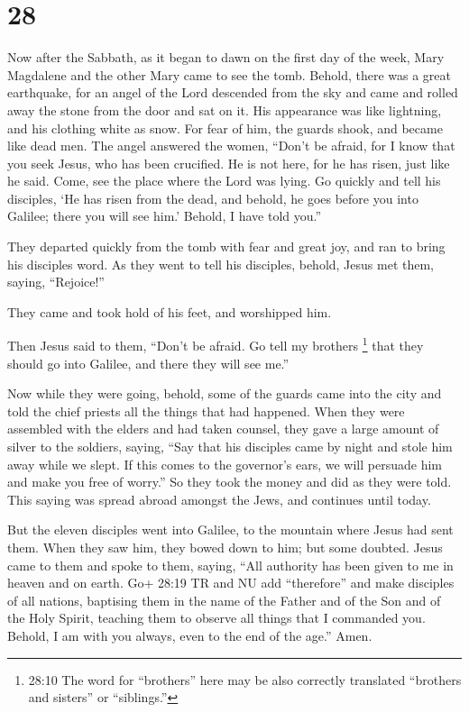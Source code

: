 \hypertarget{section-27}{%
\section{28}\label{section-27}}

 Now after the Sabbath, as it began to dawn on the first day
of the week, Mary Magdalene and the other Mary came to see the tomb.
 Behold, there was a great earthquake, for an angel of the
Lord descended from the sky and came and rolled away the stone from the
door and sat on it.  His appearance was like lightning, and
his clothing white as snow.  For fear of him, the guards
shook, and became like dead men.  The angel answered the
women, ``Don't be afraid, for I know that you seek Jesus, who has been
crucified.  He is not here, for he has risen, just like he
said. Come, see the place where the Lord was lying.  Go
quickly and tell his disciples, `He has risen from the dead, and behold,
he goes before you into Galilee; there you will see him.' Behold, I have
told you.''

 They departed quickly from the tomb with fear and great
joy, and ran to bring his disciples word.  As they went to
tell his disciples, behold, Jesus met them, saying, ``Rejoice!''

They came and took hold of his feet, and worshipped him.

 Then Jesus said to them, ``Don't be afraid. Go tell my
brothers \footnote{28:10 The word for ``brothers'' here may be also
  correctly translated ``brothers and sisters'' or ``siblings.''} that
they should go into Galilee, and there they will see me.''

 Now while they were going, behold, some of the guards came
into the city and told the chief priests all the things that had
happened.  When they were assembled with the elders and had
taken counsel, they gave a large amount of silver to the soldiers,
 saying, ``Say that his disciples came by night and stole
him away while we slept.  If this comes to the governor's
ears, we will persuade him and make you free of worry.'' 
So they took the money and did as they were told. This saying was spread
abroad amongst the Jews, and continues until today.

 But the eleven disciples went into Galilee, to the
mountain where Jesus had sent them.  When they saw him,
they bowed down to him; but some doubted.  Jesus came to
them and spoke to them, saying, ``All authority has been given to me in
heaven and on earth.  Go+ 28:19 TR and NU add ``therefore''
and make disciples of all nations, baptising them in the name of the
Father and of the Son and of the Holy Spirit,  teaching
them to observe all things that I commanded you. Behold, I am with you
always, even to the end of the age.'' Amen.

